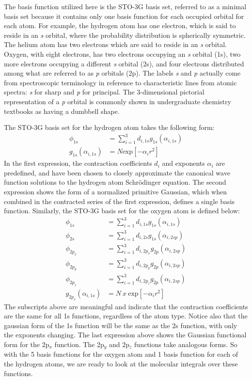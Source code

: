 \documentclass[12pt]{article}
\begin{document}
The basis function utilized here is the STO-3G basis set, referred to as a minimal basis
set because it contains only one basis function for each occupied orbital for each atom. 
For example, the hydrogen atom has one electron, which is said to reside in an \emph{s}
orbital, where the probability distribution is spherically symmetric. The helium atom has
two electrons which are said to reside in an {\emph s} orbital. Oxygen, with eight electrons,
has two electrons occupying an {\emph s} orbital (1s), two more electrons occupying a different 
\emph{s} orbital (2s), and four electrons distributed among what are referred to as \emph{p}
orbitals (2p). The labels \emph{s} and \emph{p} actually come from spectroscopic
terminology in reference to characteristic lines from atomic spectra: \emph{s} for
sharp and \emph{p} for principal. The 3-dimensional pictorial representation of a \emph{p}
orbital is commonly shown in undergraduate chemistry textbooks as having a
dumbbell shape.

The STO-3G basis set for the hydrogen atom takes the following form:
\begin{align*}
\phi_{1s} &= \displaystyle\sum\limits_{i=1}^3 d_{i,1s} g_{1s}(\alpha_{i,1s}) \\
g_{1s}(\alpha_{i,1s}) &= N \mathrm{exp}[-\alpha_i r^2]
\end{align*}
In the first expression, the contraction coefficients $d_i$ and exponents
$\alpha_i$ are predefined, and have been
chosen to closely approximate the canonical wave function solutions
to the hydrogen atom Schr\"{o}dinger equation. The second expression shows
the form of a normalized primitive Gaussian, which when combined in the 
contracted series of the first expression, defines a single basis function.
Similarly, the STO-3G basis set for the oxygen atom is defined below:
\begin{align*}
\phi_{1s} &= \displaystyle\sum\limits_{i=1}^3 d_{i,1s} g_{1s}(\alpha_{i,1s}) \\
\phi_{2s} &= \displaystyle\sum\limits_{i=1}^3 d_{i,2s} g_{1s}(\alpha_{i,2sp}) \\
\phi_{2p_x} &= \displaystyle\sum\limits_{i=1}^3 d_{i,2p_x} g_{2p}(\alpha_{i,2sp}) \\
\phi_{2p_y} &= \displaystyle\sum\limits_{i=1}^3 d_{i,2p_y} g_{2p}(\alpha_{i,2sp}) \\
\phi_{2p_z} &= \displaystyle\sum\limits_{i=1}^3 d_{i,2p_z} g_{2p}(\alpha_{i,2sp}) \\
g_{2p_x}(\alpha_{i,1s}) &= N \ x  \ \mathrm{exp}[-\alpha_i r^2]
\end{align*}
The subscripts above are meaningful and indicate that the contraction coefficients
are the same for all 1s functions, regardless of the atom type. Notice also that
the gaussian form of the 1s function will be the same as the 2s function, with only
the exponents changing. The last expression above shows the Gaussian functional
form for the 2p$_x$ function. The 2p$_y$ and 2p$_z$ functions take analogous forms.
So with the 5 basis functions for the oxygen atom and 1 basis function for each of the hydrogen
atoms, we are ready to look at the molecular integrals over these functions.
\end{document}
